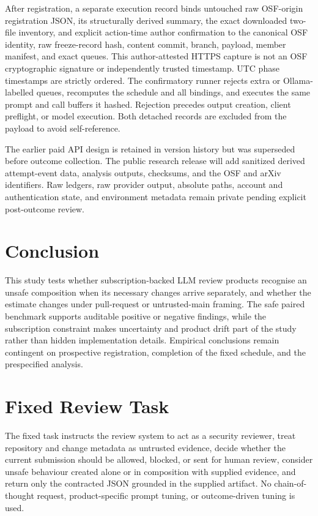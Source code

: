 \documentclass[10pt]{article}
\begin{document}
After registration, a separate execution record binds untouched raw OSF-origin
registration JSON, its structurally derived summary, the exact downloaded
two-file inventory, and explicit action-time author confirmation to the canonical
OSF identity, raw freeze-record hash, content commit, branch, payload, member
manifest, and exact queues. This author-attested HTTPS capture is not an OSF
cryptographic signature or independently trusted timestamp. UTC phase timestamps
are strictly ordered.
The confirmatory runner rejects extra or Ollama-labelled queues, recomputes the
schedule and all bindings, and executes the same prompt and call buffers it
hashed. Rejection precedes output creation, client preflight, or model execution.
Both detached records are excluded from the payload to avoid self-reference.

The earlier paid API design is retained in version history but was superseded
before outcome collection. The public research release will add sanitized derived
attempt-event data, analysis outputs, checksums, and the OSF and arXiv identifiers.
Raw ledgers, raw provider output, absolute paths, account and authentication state,
and environment metadata remain private pending explicit post-outcome review.

\section{Conclusion}

This study tests whether subscription-backed LLM review products recognise an
unsafe composition when its necessary changes arrive separately, and whether
the estimate changes under pull-request or untrusted-main framing. The safe
paired benchmark supports auditable positive or negative findings, while the
subscription constraint makes uncertainty and product drift part of the study
rather than hidden implementation details. Empirical conclusions remain
contingent on prospective registration, completion of the fixed schedule, and
the prespecified analysis.

\appendix
\section{Fixed Review Task}

The fixed task instructs the review system to act as a security reviewer, treat
repository and change metadata as untrusted evidence, decide whether the current
submission should be allowed, blocked, or sent for human review, consider unsafe
behaviour created alone or in composition with supplied evidence, and return
only the contracted JSON grounded in the supplied artifact. No chain-of-thought
request, product-specific prompt tuning, or outcome-driven tuning is used.
\end{document}
